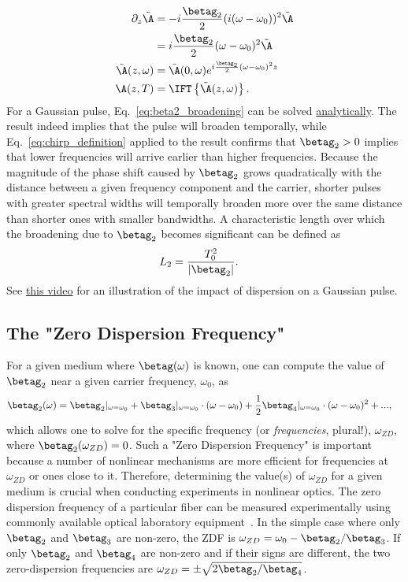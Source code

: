 \begin{align}
    \label{eq:beta2_broadening}
    \partial_z \Tilde{\A} &= -i  \frac{\betag_2}{2} (i(\omega-\omega_0))^2 \Tilde{\A} \\ \nonumber
    &= i  \frac{\betag_2}{2}(\omega-\omega_0)^2\Tilde{\A} \\ \nonumber
    \Tilde{\A}(z,\omega)&=\Tilde{\A}(0,\omega)e^{i\frac{\betag_2}{2}(\omega-\omega_0)^2z} \\ \nonumber
    \A(z,T) &= \IFT\left\{  \Tilde{\A}(z,\omega)   \right\}.
\end{align}
For a Gaussian pulse, Eq.~\ref{eq:beta2_broadening} can be solved \href{https://drive.google.com/file/d/17Ab3bg0Hx0x8J-5lR29ejFg0eOlv6Psh/view?usp=sharing}{analytically}. The result indeed implies that the pulse will broaden temporally, while Eq.~\ref{eq:chirp_definition} applied to the result confirms that $\betag_2>0$ implies that lower frequencies will arrive earlier than higher frequencies. Because the magnitude of the phase shift caused by $\betag_2$ grows quadratically with the distance between a given frequency component and the carrier, shorter pulses with greater spectral widths will temporally broaden more over the same distance than shorter ones with smaller bandwidths. A characteristic length over which the broadening due to $\betag_2$ becomes significant can be defined as
\begin{align}
    \label{eq:Dispersion_length}
    L_{2} &= \frac{T_0^2}{|\betag_2|}.
\end{align}
See \href{https://www.youtube.com/watch?v=BP6Ra98AEuU}{this video} for an illustration of the impact of dispersion on a Gaussian pulse. 

\subsection{The "Zero Dispersion Frequency"}
\label{subsec:ZDF}
For a given medium where $\betag(\omega)$ is known, one can compute the value of $\betag_2$ near a given carrier frequency, $\omega_0$, as
\begin{align}
\label{eq:ZDF}
    \betag_2(\omega) &= \betag_2|_{\omega=\omega_0} + \betag_3|_{\omega=\omega_0}\cdot(\omega-\omega_0)+\frac{1}{2}\betag_4|_{\omega=\omega_0}\cdot(\omega-\omega_0)^2 +...,
\end{align}
which allows one to solve for the specific frequency (or \emph{frequencies}, plural!), $\omega_{ZD}$, where $\betag_2(\omega_{ZD})=0$. Such a "Zero Dispersion Frequency" is important because a number of nonlinear mechanisms are more efficient for frequencies at $\omega_{ZD}$ or ones close to it. Therefore, determining the value(s) of $\omega_{ZD}$ for a given medium is crucial when conducting experiments in nonlinear optics. The zero dispersion frequency of a particular fiber can be measured experimentally using commonly available optical laboratory equipment~\cite{zero_disp_measurement}. In the simple case where only $\betag_2$ and $\betag_3$ are non-zero, the ZDF is $\omega_{ZD} = \omega_0-\betag_2/\betag_3$. If only $\betag_2$ and $\betag_4$ are non-zero and if their signs are different, the two zero-dispersion frequencies are $\omega_{ZD} = \pm \sqrt{2\betag_2/\betag_4}$. 

